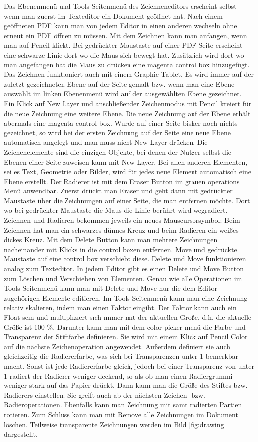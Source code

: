 Das Ebenenmenü und Tools Seitenmenü des Zeichneneditors erscheint selbst wenn man zuerst im Texteditor ein Dokument geöffnet hat. Nach einem geöffneten PDF kann man von jedem Editor in einen anderen wechseln ohne erneut ein PDF öffnen zu müssen. Mit dem Zeichnen kann man anfangen, wenn man auf Pencil klickt. Bei gedrückter Maustaste auf einer PDF Seite erscheint eine schwarze Linie dort wo die Maus sich bewegt hat. Zusätzlich wird dort wo man angefangen hat die Maus zu drücken eine magenta control box hinzugefügt. Das Zeichnen funktioniert auch mit einem Graphic Tablet. Es wird immer auf der zuletzt gezeichneten Ebene auf der Seite gemalt bzw. wenn man eine Ebene auswählt im linken Ebenenmenü wird auf der ausgewählten Ebene gezeichnet. Ein Klick auf New Layer und anschließender Zeichenmodus mit Pencil kreiert für die neue Zeichnung eine weitere Ebene. Die neue Zeichnung auf der Ebene erhält abermals eine magenta control box. Wurde auf einer Seite bisher noch nichts gezeichnet, so wird bei der ersten Zeichnung auf der Seite eine neue Ebene automatisch angelegt und man muss nicht New Layer drücken. Die Zeichenelemente sind die einzigen Objekte, bei denen der Nutzer selbst die Ebenen einer Seite zuweisen kann mit New Layer. Bei allen anderen Elementen, sei es Text, Geometrie oder Bilder, wird für jedes neue Element automatisch eine Ebene erstellt. Der Radierer ist  mit dem Eraser Button im grauen operations Menü anwendbar. Zuerst drückt man Eraser und geht dann mit gedrückter Maustaste über die Zeichnungen auf einer Seite, die man entfernen möchte. Dort wo bei gedrückter Maustaste die Maus die Linie berührt wird wegradiert. Zeichnen und Radieren bekommen jeweils ein neues Mauscursorsymbol: Beim Zeichnen hat man ein schwarzes dünnes Kreuz und beim Radieren ein weißes dickes Kreuz. Mit dem Delete Button kann man mehrere Zeichnungen nacheinander mit Klicks in die control boxen entfernen. Move und gedrückte Maustaste auf eine control box verschiebt diese. Delete und Move funktionieren analog zum Texteditor. In jedem Editor gibt es einen Delete und Move Button zum Löschen und Verschieben von Elementen. Genau wie alle Operationen im Tools Seitenmenü kann man mit Delete und Move nur die dem Editor zugehörigen Elemente editieren. Im Tools Seitenmenü kann man eine Zeichnung relativ skalieren, indem man einen Faktor eingibt. Der Faktor kann auch ein Float sein und multipliziert sich immer mit der aktuellen Größe, d.h. die aktuelle Größe ist 100 \%. Darunter kann man mit dem color picker menü die Farbe und Transparenz der Stiftfarbe definieren. Sie wird mit einem Klick auf Pencil Color auf die nächste Zeichenoperation angewendet. Außerdem definiert sie auch gleichzeitig die Radiererfarbe, was sich bei Transparenzen unter 1 bemerkbar macht. Sonst ist jede Radiererfarbe gleich, jedoch bei einer Transparenz von unter 1 radiert der Radierer weniger deckend, so als ob man einen Radiergrummi weniger stark auf das Papier drückt. Dann kann man die Größe des Stiftes bzw. Radierers einstellen. Sie greift auch ab der nächsten Zeichen- bzw. Radieroperationen. Ebenfalls kann man Zeichnung mit samt radierten Partien rotieren. Zum Schluss kann man mit Remove alle Zeichnungen im Dokument löschen. Teilweise transparente Zeichnungen werden im Bild \ref{fig:drawing} dargestellt. 

